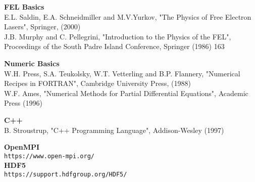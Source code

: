 \documentclass[12pt]{book}
\begin{document}
{\bf FEL Basics}\\
E.L. Saldin, E.A. Schneidmiller and M.V.Yurkov, "The Physics of Free Electron 
Lasers", Springer, (2000)\\
J.B. Murphy and C. Pellegrini, "Introduction to the Physics of the FEL", 
Proceedings of the South Padre Island Conference, Springer (1986) 163

{\bf Numeric Basics}\\
W.H. Press, S.A. Teukolsky, W.T. Vetterling and B.P. Flannery, "Numerical 
Recipes in FORTRAN", Cambridge University Press, (1988)\\
W.F. Ames, "Numerical Methods for Partial Differential Equations", Academic 
Press (1996)

{\bf C++}\\
B. Stroustrup, "C++ Programming Language", Addison-Wesley (1997)

{\bf OpenMPI}\\
{\tt https://www.open-mpi.org/}\\


{\bf HDF5}\\
{\tt https://support.hdfgroup.org/HDF5/}
\end{document}
